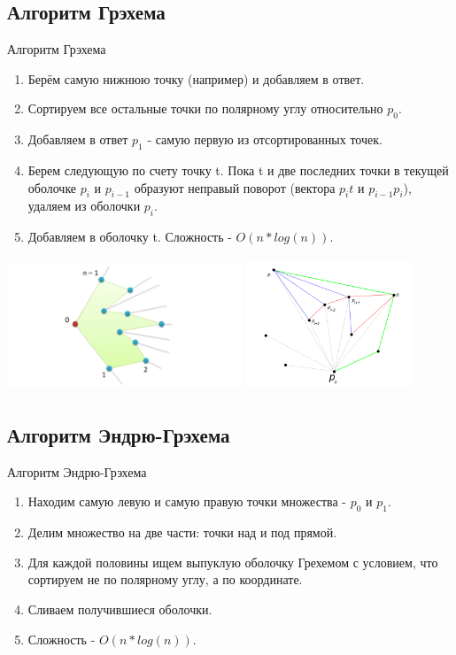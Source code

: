 \documentclass[10pt]{beamer}
\begin{document}
\subsection{Алгоритм Грэхема}
\begin{frame}[fragile]{Алгоритм Грэхема}
\begin{enumerate}
\item Берём самую нижнюю точку (например) и добавляем в ответ.
\item Сортируем все остальные точки по полярному углу относительно $p_0$.
\item Добавляем в ответ $p_1$ - самую первую из отсортированных точек.
\item Берем следующую по счету точку t. Пока t и две последних точки в текущей оболочке $p_i$ и $p_{i-1}$ образуют неправый поворот (вектора $p_i t$ и $p_{i-1} p_i$), удаляем из оболочки $p_i$.
\item Добавляем в оболочку t. Сложность - $O(n*log(n))$.
\end{enumerate}
\begin{center}
\includegraphics[width=7cm, height=4cm]{Term_3/Source/Pictures/graham2.png}
\includegraphics[width=5cm, height=4cm]{Term_3/Source/Pictures/graham.png}
\end{center}
\end{frame}

\subsection{Алгоритм Эндрю-Грэхема}
\begin{frame}[fragile]{Алгоритм Эндрю-Грэхема}
\begin{enumerate}
\item Находим самую левую и самую правую точки множества - $p_0$ и $p_1$.
\item Делим множество на две части: точки над и под прямой.
\item Для каждой половины ищем выпуклую оболочку Грехемом с условием, что сортируем не по полярному углу, а по координате.
\item Сливаем получившиеся оболочки.
\item Сложность - $O(n*log(n))$.
\end{enumerate}
\end{frame}
\end{document}
